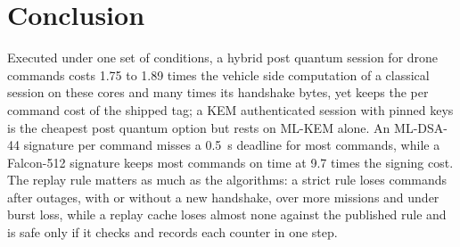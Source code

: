 \documentclass[conference]{IEEEtran}
\begin{document}
\section{Conclusion}
Executed under one set of conditions, a hybrid post quantum session for drone commands costs 1.75 to 1.89 times the vehicle side computation of a classical session on these cores and many times its handshake bytes, yet keeps the per command cost of the shipped tag; a KEM authenticated session with pinned keys is the cheapest post quantum option but rests on ML-KEM alone. An ML-DSA-44 signature per command misses a 0.5~s deadline for most commands, while a Falcon-512 signature keeps most commands on time at 9.7 times the signing cost. The replay rule matters as much as the algorithms: a strict rule loses commands after outages, with or without a new handshake, over more missions and under burst loss, while a replay cache loses almost none against the published rule and is safe only if it checks and records each counter in one step.



\end{document}
